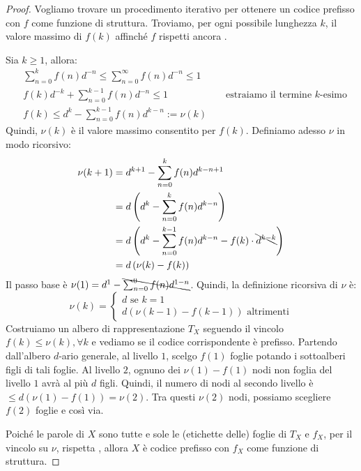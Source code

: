 \begin{proof}
  Vogliamo trovare un procedimento iterativo per ottenere un codice prefisso con $f$ come funzione di struttura. Troviamo, per ogni possibile lunghezza $k$, il valore massimo di $f(k)$ affinché $f$ rispetti ancora .

  Sia \(k \geq 1\), allora: 
  \begin{align*}
    &\sum_{n=0}^{k}f(n)d^{-n} \leq \sum_{n=0}^{\infty}f(n)d^{-n} \leq 1 \\
    &f(k)d^{-k} + \sum_{n=0}^{k-1}f(n)d^{-n} \leq 1 &&\text{ estraiamo il termine $k$-esimo} \\
    &f(k)\leq d^{k}-\sum_{n=0}^{k-1}f(n)d^{k-n} := \nu(k)
  \end{align*}
  Quindi, $\nu(k)$ è il valore massimo consentito per $f(k)$. Definiamo adesso $\nu$ in modo ricorsivo:
  \begin{align*}
    \nu(k+1)&= d^{k+1}-\sum^{k}_{n=0}f(n)d^{k-n+1} \\
    &=d\left(d^{k} - \sum^{k}_{n=0}f(n)d^{k-n}\right) \\
    &=d\left(d^{k} - \sum^{k-1}_{n=0}f(n)d^{k-n} - f(k)\cdot \bcancel{d^{k-k}}\right) \\
    &=d\left(\nu(k) - f(k)\right)
  \end{align*}
  Il passo base è $\nu(1) = d^{1} - \bcancel{\sum^{0}_{n=0}f(n)d^{1-n}}$.
  Quindi, la definizione ricorsiva di $\nu$ è:
  $$\nu(k)=\begin{cases}
    d \text{ se } k=1 \\
    d(\nu(k-1)-f(k-1)) \text{ altrimenti}
  \end{cases}$$
  Costruiamo un albero di rappresentazione $T_X$ seguendo il vincolo $f(k)\leq\nu(k), \forall k$ e vediamo se il codice corrispondente è prefisso.
  Partendo dall'albero $d$-ario generale, al livello $1$, scelgo $f(1)$ foglie potando i sottoalberi figli di tali foglie. Al livello $2$, ognuno dei $\nu(1)-f(1)$ nodi non foglia del livello $1$ avrà al più $d$ figli. Quindi, il numero di nodi al secondo livello è $\leq d(\nu(1)-f(1))=\nu(2)$. Tra questi $\nu(2)$ nodi, possiamo scegliere $f(2)$ foglie e così via.

  Poiché le parole di $X$ sono tutte e sole le (etichette delle) foglie di $T_X$ e $f_X$, per il vincolo su $\nu$, rispetta , allora $X$ è codice prefisso con $f_X$ come funzione di struttura.
\end{proof}

